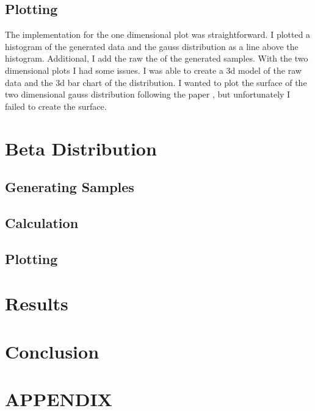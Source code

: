 \documentclass[10pt, a4paper, twocolumn]{article} %
\begin{document}
\subsection{Plotting}
The implementation for the one dimensional plot was straightforward. I plotted a histogram of the generated data and the gauss distribution as a line above the histogram. Additional, I add the raw the of the generated samples. With the two dimensional plots I had some issues. I was able to create a 3d model of the raw data and the 3d bar chart of the distribution. I wanted to plot the surface of the two dimensional gauss distribution following the paper \citep{multiVariateNormalDistribution}, but unfortunately I failed to create the surface. 

\section{Beta Distribution}

\subsection{Generating Samples}

\subsection{Calculation}

\subsection{Plotting}

\section{Results}

\section{Conclusion}

\section*{APPENDIX}

\onecolumn
\onecolumn
\onecolumn




\printbibliography[title={Bibliography}] %

\end{document}

